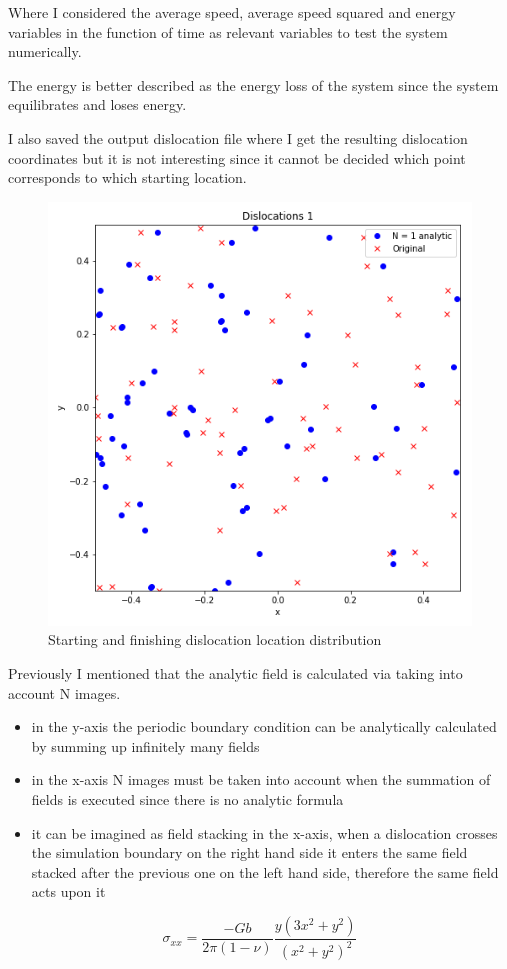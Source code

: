 \documentclass[12pt,a4paper]{article}
\theoremstyle{plain}
\begin{document}
\begin{multicols*}{2}
	\par Where I considered the average speed, average speed squared and energy variables in the function of time
	as relevant variables to test the system numerically.

	\par The energy is better described as the energy loss of the system since the system equilibrates
	and loses energy.

	\par I also saved the output dislocation file where I get the
	resulting dislocation coordinates but it is not interesting since it cannot
	be decided which point corresponds to which starting location.

	\begin{figure}[H]
		\centering
		\includegraphics[width=0.4\columnwidth]{Dislocations1.png}
		\caption{Starting and finishing dislocation location distribution}
	\end{figure}

	\par Previously I mentioned that the analytic field is calculated via taking into account N images.

	\begin{itemize}
		\item in the y-axis the periodic boundary condition can be analytically calculated by summing up infinitely many fields
		\item in the x-axis N images must be taken into account when the summation of fields is executed since there is no analytic formula
		\item it can be imagined as field stacking in the x-axis, when a dislocation crosses the simulation boundary on the right hand side it enters the same field stacked after the previous one on the left hand side, therefore the same field acts upon it
	\end{itemize}

	\begin{equation*}
		\sigma_{xx} = \frac{-Gb}{2\pi(1-\nu)}\frac{y(3x^{2} + y^{2})}{(x^{2} + y^{2})^{2}}
	\end{equation*}


\end{multicols*}
\end{document}
